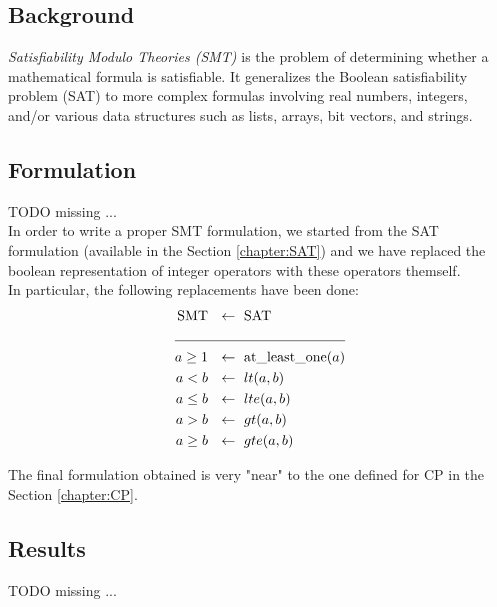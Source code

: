 
\subsection{Background}
    \textit{Satisfiability Modulo Theories (SMT)} is the problem of determining whether a
    mathematical formula is satisfiable. It generalizes the Boolean satisfiability problem (SAT) to
    more complex formulas involving real numbers, integers, and/or various data structures such as 
    lists, arrays, bit vectors, and strings.


\subsection{Formulation}
    \colorbox{BurntOrange}{TODO missing ...} \\

    In order to write a proper SMT formulation, we started from the SAT formulation (available in
    the Section \ref*{chapter:SAT}) and we have replaced the boolean representation of integer 
    operators with these operators themself.\\

    In particular, the following replacements have been done:
    \begin{align*}
      \text{SMT} \ &\ \leftarrow\ \text{SAT}      \\
                 \cline{1-2}
        a \geq 1 \ &\ \leftarrow\ \text{at\_least\_one}(a) \\
           a < b \ &\ \leftarrow\ lt(a,b)         \\
        a \leq b \ &\ \leftarrow\ lte(a,b)        \\
           a > b \ &\ \leftarrow\ gt(a,b)         \\
        a \geq b \ &\ \leftarrow\ gte(a,b)   
    \end{align*}

    The final formulation obtained is very "near" to the one defined for CP in the
    Section \ref{chapter:CP}.


\subsection{Results}
    \colorbox{BurntOrange}{TODO missing ...} \\
